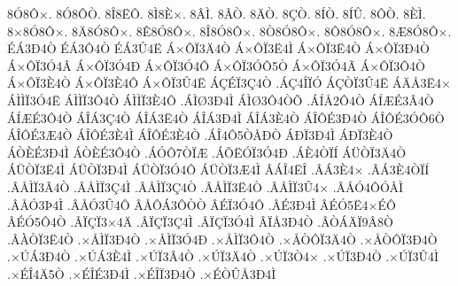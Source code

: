 {8^^d38^^d4^^d7.
8^^d38^^d4^^d2.
8^^ce8^^cb^^d4.
8^^cc8^^c8^^d7.
8^^c2^^cc.
8^^c2^^d2.
8^^c4^^d2.
8^^c7^^d2.
8^^cd^^d2.
8^^cd^^db.
8^^d4^^d2.
8^^c8^^cc.
8^^d78^^d38^^d4^^d7.
8^^c48^^d38^^d4^^d7.
8^^ca8^^d38^^d4^^d7.
8^^ce8^^d38^^d4^^d7.
8^^d28^^d38^^d4^^d7.
8^^d48^^d38^^d4^^d7.
8^^c68^^d38^^d4^^d7.
^^c9^^c13^^d04^^d2
^^c9^^c13^^d44^^d2
^^c9^^c13^^db4^^cb
^^c1^^d7^^d4^^cf3^^c44^^d2
^^c1^^d7^^d4^^cf3^^cb4^^cc
^^c1^^d7^^d4^^cf3^^cb4^^d2
^^c1^^d7^^d4^^cf3^^d04^^d2
^^c1^^d7^^d4^^cf3^^d34^^c2
^^c1^^d7^^d4^^cf3^^d34^^d0
^^c1^^d7^^d4^^cf3^^d34^^d4
^^c1^^d7^^d4^^cf3^^d3^^d45^^d2
^^c1^^d7^^d4^^cf3^^d34^^c3
^^c1^^d7^^d4^^cf3^^d44^^d2
^^c1^^d7^^d4^^cf3^^c84^^d2
^^c1^^d7^^d4^^cf3^^c84^^d4
^^c1^^d7^^d4^^cf3^^db4^^cb
^^c1^^c7^^c9^^cf3^^c74^^d2
.^^c1^^c74^^ce^^cf^^d3
^^c1^^c7^^d2^^cf3^^db4^^cb
^^c1^^c4^^c53^^cb4^^d7
^^c1^^cc^^cc^^cf3^^d34^^cb
^^c1^^cc^^cc^^cf3^^d44^^d2
^^c1^^cc^^cc^^cf3^^c84^^d4
.^^c1^^cc^^d83^^d04^^cc
^^c1^^cc^^d83^^d44^^d2^^d5
.^^c1^^cd^^c52^^d44^^d2
^^c1^^cd^^c6^^c93^^c24^^d2
^^c1^^cd^^c6^^c93^^d44^^d2
^^c1^^ce^^c13^^c74^^d2
^^c1^^ce^^c13^^cb4^^d2
^^c1^^ce^^c13^^d04^^cc
^^c1^^ce^^c13^^c84^^d2
^^c1^^ce^^d4^^c93^^d04^^d2
^^c1^^ce^^d4^^c93^^d3^^d46^^d2
^^c1^^ce^^d4^^c93^^c64^^d2
^^c1^^ce^^d4^^c93^^c84^^cc
^^c1^^ce^^d4^^c93^^c84^^d2
.^^c1^^ce4^^d45^^d2^^c5^^d0^^d2
^^c1^^d0^^cf3^^d04^^cc
^^c1^^d0^^cf3^^c84^^d2
^^c1^^d2^^c8^^c93^^d04^^cc
^^c1^^d2^^c8^^c93^^d44^^d2
.^^c1^^d3^^d47^^d2^^cf^^c6
.^^c1^^d5^^cb^^d3^^cf3^^d34^^d0
.^^c1^^c84^^d2^^cf^^cd
^^c1^^dc^^d2^^cf3^^c44^^d2
^^c1^^dc^^d2^^cf3^^cb4^^cc
^^c1^^dc^^d2^^cf3^^d04^^cc
^^c1^^dc^^d2^^cf3^^d34^^d4
^^c1^^dc^^d2^^cf3^^c64^^cc
^^c2^^c1^^ce4^^cb^^ce
.^^c2^^c13^^c84^^d7
.^^c2^^c13^^c84^^d2^^cf^^cd
.^^c2^^c5^^cc^^cf3^^c24^^d2
.^^c2^^c5^^cc^^cf3^^c74^^cc
.^^c2^^c5^^cc^^cf3^^c74^^d2
.^^c2^^c5^^cc^^cf3^^cb4^^d2
.^^c2^^c5^^cc^^cf3^^db4^^d7
.^^c2^^c5^^d34^^d4^^d3^^c5^^cc
.^^c2^^c5^^d33^^de4^^cc
.^^c2^^c5^^d33^^db4^^d4
^^c2^^c5^^d4^^c13^^d4^^d2^^d2
^^c2^^c9^^cf3^^d34^^d4
.^^c2^^c93^^d04^^cc
^^c2^^c9^^d35^^cb4^^d7^^c9^^d4
^^c2^^c9^^d35^^d44^^d2
.^^c2^^cf^^c7^^cf3^^d74^^c4
.^^c2^^cf^^c7^^cf3^^c74^^cc
.^^c2^^cf^^c7^^cf3^^d34^^cc
^^c2^^cf^^c53^^d04^^d2
.^^c2^^d2^^c1^^c4^^cf9^^c28^^d2
.^^c2^^c0^^d2^^cf3^^cb4^^d2
.^^d7^^c5^^cc^^cf3^^d04^^d2
.^^d7^^c5^^cc^^cf3^^d34^^d0
.^^d7^^c5^^cc^^cf3^^d44^^d2
.^^d7^^c5^^d2^^d4^^cf3^^c44^^d2
.^^d7^^c5^^d2^^d4^^cf3^^d04^^d2
.^^d7^^da^^c13^^d04^^d2
.^^d7^^da^^c13^^c84^^cc
.^^d7^^da^^cf3^^c24^^d2
.^^d7^^da^^cf3^^c44^^d2
.^^d7^^da^^cf3^^d24^^d7
.^^d7^^da^^cf3^^d04^^d2
.^^d7^^da^^cf3^^db4^^cc
.^^d7^^c9^^ce4^^c45^^d2
.^^d7^^c9^^ce^^c93^^d04^^cc
.^^d7^^c9^^ce^^cf3^^d04^^d2
.^^d7^^c9^^d2^^db^^c53^^d04^^cc
}
